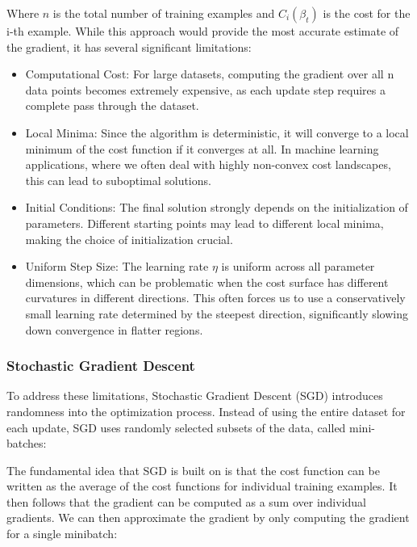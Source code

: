 Where \( n\) is the total number of training examples and \( C_i(\beta_t) \) is the cost for the i-th example. While this approach would provide the most accurate estimate of the gradient, it has several significant limitations:
\begin{itemize}
    \item Computational Cost: For large datasets, computing the gradient over all n data points becomes extremely expensive, as each update step requires a complete pass through the dataset.
    \item Local Minima: Since the algorithm is deterministic, it will converge to a local minimum of the cost function if it converges at all. In machine learning applications, where we often deal with highly non-convex cost landscapes, this can lead to suboptimal solutions.
    \item Initial Conditions: The final solution strongly depends on the initialization of parameters. Different starting points may lead to different local minima, making the choice of initialization crucial.
    \item Uniform Step Size: The learning rate \( \eta \) is uniform across all parameter dimensions, which can be problematic when the cost surface has different curvatures in different directions. This often forces us to use a conservatively small learning rate determined by the steepest direction, significantly slowing down convergence in flatter regions.
\end{itemize}

\subsubsection{Stochastic Gradient Descent}

To address these limitations, Stochastic Gradient Descent (SGD) introduces randomness into the optimization process. Instead of using the entire dataset for each update, SGD uses randomly selected subsets of the data, called mini-batches:

The fundamental idea that SGD is built on is that the cost function can be written as the average of the cost functions for individual training examples. It then follows that the gradient can be computed as a sum over individual gradients. We can then approximate the gradient by only computing the gradient for a single minibatch:

